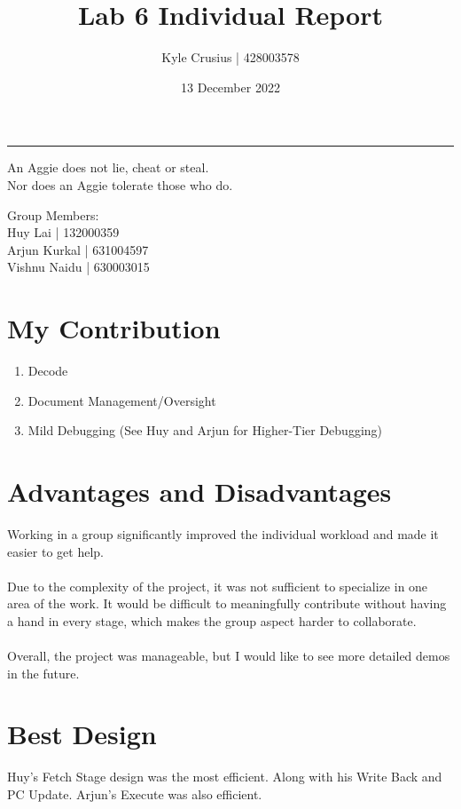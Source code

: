 \documentclass[fleqn,12pt]{article}
\title{\vspace{-2.5cm}Lab 6 Individual Report}
\author{
    Kyle Crusius | 428003578
}
\affil{Texas A\&M University}
\date{\vspace{-28pt}13 December 2022}
\begin{document}
\maketitle
\begin{center}
\vspace{-42pt}
\rule{\textwidth}{.1pt}
{\large
An Aggie does not lie, cheat or steal.\\
Nor does an Aggie tolerate those who do.
}
\end{center}
\begin{center}
Group Members:\\
Huy Lai | 132000359\\
Arjun Kurkal | 631004597\\
Vishnu Naidu | 630003015
\end{center}

\section*{My Contribution}
\begin{enumerate}
    \item Decode
    \item Document Management/Oversight 
    \item Mild Debugging (See Huy and Arjun for Higher-Tier Debugging)
\end{enumerate} 

\section*{Advantages and Disadvantages}
Working in a group significantly improved the individual workload and made it easier to get help. \\\\
Due to the complexity of the project, it was not sufficient to specialize in one area of the work. It would be difficult to meaningfully contribute without having a hand in every stage, which makes the group aspect harder to collaborate. \\\\
Overall, the project was manageable, but I would like to see more detailed demos in the future.

\section*{Best Design}
Huy's Fetch Stage design was the most efficient. Along with his Write Back and PC Update.
Arjun's Execute was also efficient.
\end{document}
